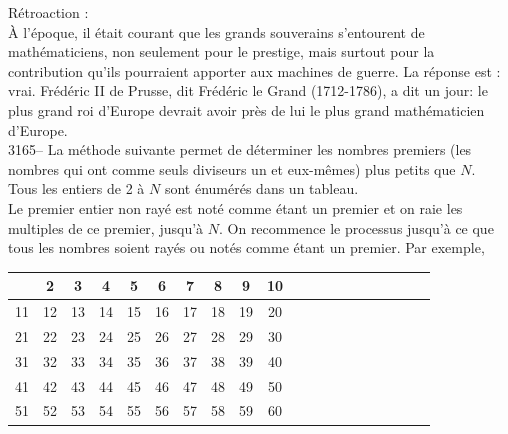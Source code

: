 \documentclass[letterpaper, 12pt]{article}
\begin{document}
R\'etroaction :\\
\`A l'\'epoque, il \'etait courant que les grands souverains s'entourent de math\'ematiciens, non seulement pour le prestige, mais surtout pour la contribution qu'ils pourraient apporter aux machines de guerre. La r\'eponse est : vrai. Fr\'ed\'eric II de Prusse, dit Fr\'ed\'eric le Grand (1712-1786), a dit un jour: \og le plus grand roi d'Europe devrait avoir pr\`es de lui le plus grand math\'ematicien d'Europe\fg.\\



3165-- La m\'ethode suivante permet de d\'eterminer les nombres premiers (les nombres qui ont comme seuls diviseurs un et eux-m\^emes) plus petits que $N$.\\
Tous les entiers de 2 \`a $N$ sont \'enum\'er\'es dans un tableau.\\
Le premier entier non ray\'e est not\'e comme \'etant un premier et on raie les multiples de ce premier, jusqu'\`a $N$. On recommence le processus jusqu'\`a ce que tous les nombres soient ray\'es ou not\'es comme \'etant un premier. Par exemple,
\begin{center}
\begin{tabular}{|c|c|c|c|c|c|c|c|c|c|c|c|c|c|c|c|c|c|c|c|} \cline{2-10}
\multicolumn{1}{c|}{} & 2 & 3 & 4 & 5 & 6 & 7 & 8 & 9 & 10\\ \hline
11 & 12 & 13 & 14 & 15 & 16 & 17 & 18 & 19 & 20\\ \hline
21 & 22 & 23 & 24 & 25 & 26 & 27 & 28 & 29 & 30\\ \hline
31 & 32 & 33 & 34 & 35 & 36 & 37 & 38 & 39 & 40\\ \hline
41 & 42 & 43 & 44 & 45 & 46 & 47 & 48 & 49 & 50\\ \hline
51 & 52 & 53 & 54 & 55 & 56 & 57 & 58 & 59 & 60\\ \hline
\end{tabular}\\
\end{center}
\end{document}

